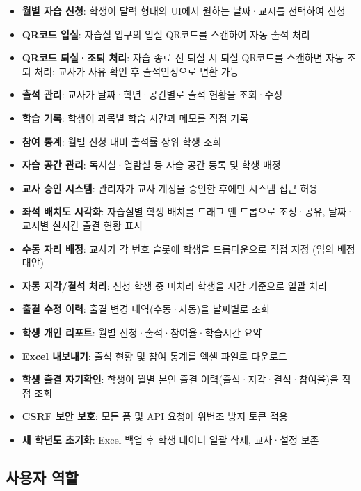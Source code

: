 \documentclass[a4paper,12pt]{article}
\begin{document}
\begin{itemize}[leftmargin=1.5em]
    \item \textbf{월별 자습 신청}: 학생이 달력 형태의 UI에서 원하는 날짜·교시를 선택하여 신청
    \item \textbf{QR코드 입실}: 자습실 입구의 입실 QR코드를 스캔하여 자동 출석 처리
    \item \textbf{QR코드 퇴실·조퇴 처리}: 자습 종료 전 퇴실 시 퇴실 QR코드를 스캔하면 자동 조퇴 처리; 교사가 사유 확인 후 출석인정으로 변환 가능
    \item \textbf{출석 관리}: 교사가 날짜·학년·공간별로 출석 현황을 조회·수정
    \item \textbf{학습 기록}: 학생이 과목별 학습 시간과 메모를 직접 기록
    \item \textbf{참여 통계}: 월별 신청 대비 출석률 상위 학생 조회
    \item \textbf{자습 공간 관리}: 독서실·열람실 등 자습 공간 등록 및 학생 배정
    \item \textbf{교사 승인 시스템}: 관리자가 교사 계정을 승인한 후에만 시스템 접근 허용
    \item \textbf{좌석 배치도 시각화}: 자습실별 학생 배치를 드래그 앤 드롭으로 조정·공유, 날짜·교시별 실시간 출결 현황 표시
    \item \textbf{수동 자리 배정}: 교사가 각 번호 슬롯에 학생을 드롭다운으로 직접 지정 (임의 배정 대안)
    \item \textbf{자동 지각/결석 처리}: 신청 학생 중 미처리 학생을 시간 기준으로 일괄 처리
    \item \textbf{출결 수정 이력}: 출결 변경 내역(수동·자동)을 날짜별로 조회
    \item \textbf{학생 개인 리포트}: 월별 신청·출석·참여율·학습시간 요약
    \item \textbf{Excel 내보내기}: 출석 현황 및 참여 통계를 엑셀 파일로 다운로드
    \item \textbf{학생 출결 자기확인}: 학생이 월별 본인 출결 이력(출석·지각·결석·참여율)을 직접 조회
    \item \textbf{CSRF 보안 보호}: 모든 폼 및 API 요청에 위변조 방지 토큰 적용
    \item \textbf{새 학년도 초기화}: Excel 백업 후 학생 데이터 일괄 삭제, 교사·설정 보존
\end{itemize}

\subsection{사용자 역할}
\end{document}
